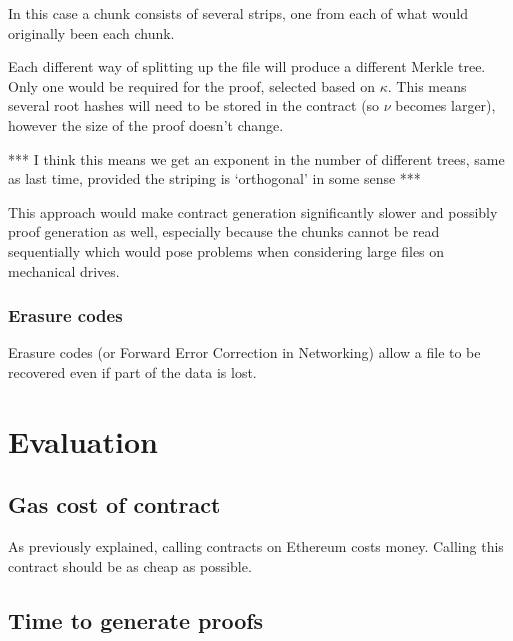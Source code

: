 \documentclass[10pt,twoside,a4paper]{article}
\begin{document}
In this case a chunk consists of several strips, one from each of what would originally been each chunk.

Each different way of splitting up the file will produce a different Merkle tree.
Only one would be required for the proof, selected based on $\kappa$.
This means several root hashes will need to be stored in the contract (so $\nu$ becomes larger),
however the size of the proof doesn't change.

*** I think this means we get an exponent in the number of different trees, same as last time, provided the striping is `orthogonal' in some sense ***

This approach would make contract generation significantly slower
and possibly proof generation as well, especially because the chunks cannot be read sequentially
which would pose problems when considering large files on mechanical drives.


\subsubsection{Erasure codes}

Erasure codes (or Forward Error Correction in Networking) allow a file to be recovered even if part of the data is lost.




\section{Evaluation}







\subsection{Gas cost of contract}

As previously explained, calling contracts on Ethereum costs money.
Calling this contract should be as cheap as possible.

\subsection{Time to generate proofs}
\end{document}
